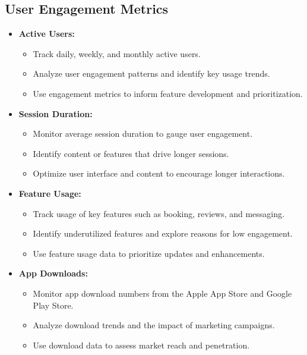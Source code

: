 \subsection{User Engagement Metrics}
\begin{itemize}[leftmargin=*]
    \item \textbf{Active Users:}
    \begin{itemize}
        \item Track daily, weekly, and monthly active users.
        \item Analyze user engagement patterns and identify key usage trends.
        \item Use engagement metrics to inform feature development and prioritization.
    \end{itemize}
    
    \item \textbf{Session Duration:}
    \begin{itemize}
        \item Monitor average session duration to gauge user engagement.
        \item Identify content or features that drive longer sessions.
        \item Optimize user interface and content to encourage longer interactions.
    \end{itemize}
    
    \item \textbf{Feature Usage:}
    \begin{itemize}
        \item Track usage of key features such as booking, reviews, and messaging.
        \item Identify underutilized features and explore reasons for low engagement.
        \item Use feature usage data to prioritize updates and enhancements.
    \end{itemize}
    
    \item \textbf{App Downloads:}
    \begin{itemize}
        \item Monitor app download numbers from the Apple App Store and Google Play Store.
        \item Analyze download trends and the impact of marketing campaigns.
        \item Use download data to assess market reach and penetration.
    \end{itemize}
\end{itemize}